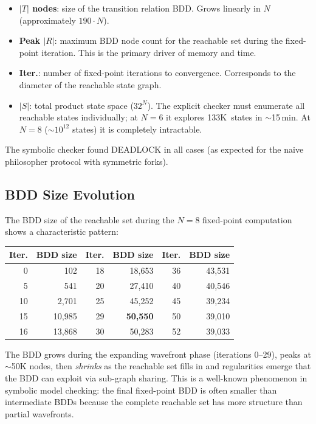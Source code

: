 \documentclass[11pt]{article}
\begin{document}
\begin{itemize}
\item \textbf{$|T|$ nodes}: size of the transition relation BDD.
      Grows linearly in $N$ (approximately $190 \cdot N$).
\item \textbf{Peak $|R|$}: maximum BDD node count for the reachable
      set during the fixed-point iteration.  This is the primary
      driver of memory and time.
\item \textbf{Iter.}: number of fixed-point iterations to convergence.
      Corresponds to the diameter of the reachable state graph.
\item \textbf{$|S|$}: total product state space ($32^N$).
      The explicit checker must enumerate all reachable states
      individually; at $N=6$ it explores 133K~states in $\sim$15\,min.
      At $N=8$ ($\sim\!10^{12}$ states) it is completely intractable.
\end{itemize}

The symbolic checker found DEADLOCK in all cases (as expected for the
naive philosopher protocol with symmetric forks).

\subsection{BDD Size Evolution}

The BDD size of the reachable set during the $N=8$ fixed-point
computation shows a characteristic pattern:

\begin{center}
\begin{tabular}{rr@{\qquad}rr@{\qquad}rr}
\toprule
\textbf{Iter.} & \textbf{BDD size} &
\textbf{Iter.} & \textbf{BDD size} &
\textbf{Iter.} & \textbf{BDD size} \\
\midrule
 0 &    102 & 18 & 18,653 & 36 & 43,531 \\
 5 &    541 & 20 & 27,410 & 40 & 40,546 \\
10 &  2,701 & 25 & 45,252 & 45 & 39,234 \\
15 & 10,985 & 29 & \textbf{50,550} & 50 & 39,010 \\
16 & 13,868 & 30 & 50,283 & 52 & 39,033 \\
\bottomrule
\end{tabular}
\end{center}

The BDD grows during the expanding wavefront phase (iterations 0--29),
peaks at $\sim$50K nodes, then \emph{shrinks} as the reachable set
fills in and regularities emerge that the BDD can exploit via
sub-graph sharing.  This is a well-known phenomenon in symbolic model
checking: the final fixed-point BDD is often smaller than intermediate
BDDs because the complete reachable set has more structure than partial
wavefronts.
\end{document}
